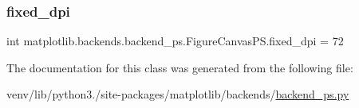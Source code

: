 \subsubsection{\texorpdfstring{fixed\+\_\+dpi}{fixed\_dpi}}
{\footnotesize\ttfamily int matplotlib.\+backends.\+backend\+\_\+ps.\+Figure\+Canvas\+P\+S.\+fixed\+\_\+dpi = 72\hspace{0.3cm}{\ttfamily [static]}}



The documentation for this class was generated from the following file\+:\begin{DoxyCompactItemize}
\item 
venv/lib/python3./site-\/packages/matplotlib/backends/\hyperlink{backend__ps_8py}{backend\+\_\+ps.\+py}\end{DoxyCompactItemize}
